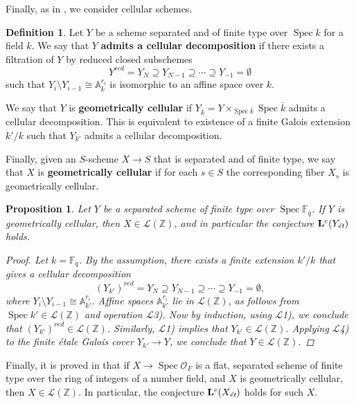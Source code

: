 \documentclass[leqno,12pt]{article}
\theoremstyle{plain}
\newtheorem{proposition}[theorem]{\indent\sc Proposition}
\theoremstyle{definition}
\newtheorem{definition}[theorem]{\indent\sc Definition}
\DeclareMathOperator{\Spec}{Spec}
\newcommand{\FF}{\mathbb{F}}
\newcommand{\ZZ}{\mathbb{Z}}
\renewcommand{\AA}{\mathbb{A}}
\newcommand{\et}{\text{\it \'{e}t}}
\begin{document}
Finally, as in \cite[\S 5.4]{Morin-2014}, we consider cellular schemes.

\begin{definition}
  Let $Y$ be a scheme separated and of finite type over $\Spec k$ for a field
  $k$. We say that $Y$ \textbf{admits a cellular decomposition} if there exists
  a filtration of $Y$ by reduced closed subschemes
  $$Y^{red} = Y_N \supseteq Y_{N-1} \supseteq \cdots \supseteq Y_{-1} = \emptyset$$
  such that $Y_i\setminus Y_{i-1} \cong \AA^{r_i}_k$ is isomorphic to an affine
  space over $k$.

  We say that $Y$ is \textbf{geometrically cellular} if
  $Y_{\overline{k}} = Y \times_{\Spec k} \Spec \overline{k}$ admits a cellular
  decomposition. This is equivalent to existence of a finite Galois extension
  $k'/k$ such that $Y_{k'}$ admits a cellular decomposition.

  Finally, given an $S$-scheme $X \to S$ that is separated and of finite type,
  we say that $X$ is \textbf{geometrically cellular} if for each $s \in S$ the
  corresponding fiber $X_s$ is geometrically cellular.
\end{definition}

\begin{proposition}
  Let $Y$ be a separated scheme of finite type over $\Spec \FF_q$.
  If $Y$ is geometrically cellular, then $X \in \mathcal{L} (\ZZ)$,
  and in particular the conjecture $\mathbf{L}^c (Y_\et)$ holds.

  \begin{proof}
    Let $k = \FF_q$. By the assumption, there exists a finite extension $k'/k$
    that gives a cellular decomposition
    $$(Y_{k'})^{red} = Y_N \supseteq Y_{N-1} \supseteq \cdots \supseteq Y_{-1} = \emptyset,$$
    where $Y_i \setminus Y_{i-1} \cong \AA^{r_i}_{k'}$. Affine spaces
    $\AA^{r_i}_{k'}$ lie in $\mathcal{L} (\ZZ)$, as follows from
    $\Spec k' \in \mathcal{L} (\ZZ)$ and operation $\mathcal{L}$3). Now by
    induction, using $\mathcal{L}$1), we conclude that
    $(Y_{k'})^{red} \in \mathcal{L} (\ZZ)$. Similarly, $\mathcal{L}$1) implies
    that $Y_{k'} \in \mathcal{L} (\ZZ)$. Applying $\mathcal{L}$4) to the finite
    \'{e}tale Galois cover $Y_{k'} \to Y$, we conclude that
    $Y \in \mathcal{L} (\ZZ)$.
  \end{proof}
\end{proposition}

Finally, it is proved in \cite[Proposition~5.14]{Morin-2014} that if
$X \to \Spec \mathcal{O}_F$ is a flat, separated scheme of finite type over the
ring of integers of a number field, and $X$ is geometrically cellular, then
$X \in \mathcal{L} (\ZZ)$. In particular, the conjecture $\mathbf{L}^c (X_\et)$
holds for such $X$.
\end{document}
